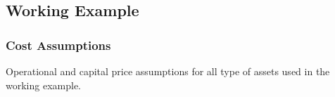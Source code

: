 \documentclass[11pt,twocolumn]{article}
\begin{document}
\subsection{Working Example}

\subsubsection{Cost Assumptions}

\begin{table}
    \centering
        
    \caption{Operational and capital price assumptions for all type of assets used in the working example.}
\end{table} 

\clearpage
\printbibliography
\end{document}
